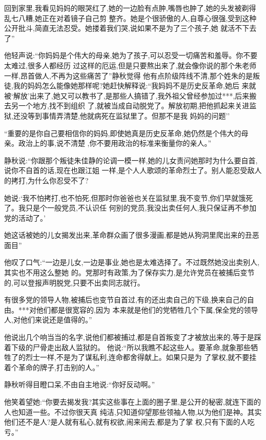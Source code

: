 ﻿\documentclass[12pt]{article}
\begin{document}
回到家里,我看见妈妈的眼哭红了,她的一边脸有点肿,嘴唇也肿了,她的头发被剃得乱七八糟,她正在对着镜子自己剪
整齐。她是个很骄傲的人,自尊心很强,受到这种公开批斗,简直无法忍受。她搂着我们哭,说如果不是为了三个孩子,她
就活不下去了\myrule ''

他轻声说:``你妈妈是个伟大的母亲,她为了孩子,可以忍受一切\myrule 痛苦和羞辱。你不要太难过,很多人都经历
过这样的厄运,但是只要熬出来了,就会像你说的那个朱老师一样,昂首做人,不再为这些痛苦了\myrule ''静秋觉得
他有点阶级阵线不清,那个姓朱的是叛徒,我的妈妈怎么能像她那样呢?她赶快解释说:``我妈妈不是历史反革命,她后
来就被`解放'出来了,她又可以教书了,是那些人搞错了,我外祖父曾经参加过***,后来搬去另一个地方,找不到组织
了,就被当成自动脱党了。解放初期,把他抓起来关进监狱,还没等到事情弄清楚,他就病死在监狱里了。但那不是我
妈妈的问题\myrule ''

``重要的是你自己要相信你的妈妈,即使她真是历史反革命,她仍然是个伟大的母亲。政治上的事,说不清楚\myrule 
,你不要用政治的标准来衡量你的\myrule 亲人。''

静秋说:``你跟那个叛徒朱佳静的论调一模一样,她的儿女责问她那时为什么要自首,说你不自首的话,现在也跟江姐
一样,是个人人歌颂的革命烈士了。别人能忍受敌人的拷打,为什么你忍受不了?

她说:`我不怕拷打,也不怕死,但那时你爸爸也关在监狱里,我不变节,你们早就饿死了。我只是个一般党员,不认识任
何别的党员,我没出卖任何人,我只保证再不参加党的活动了\myrule 。'

她这话被她的儿女揭发出来,革命群众画了很多漫画,都是她从狗洞里爬出来的丑恶面目\myrule ''

他叹了口气:``一边是儿女,一边是事业,她也是太难选择了。不过既然她没出卖别人,其实也不用\myrule 这么整她
的\myrule 。党那时有政策,为了保存实力,是允许党员在被捕后变节的,可以登报声明脱党,只要不出卖同志就行。

有很多党的领导人物,被捕后也变节自首过,有的还出卖自己的下级,换来自己的自由。***对他们都是很宽容的,因为
本来就是他们的党\myrule 牺牲几个下属,保全党的领导人,对他们来说还是值得的。''

他说出几个响当当的名字,说他们都被捕过,都是自首叛变了才被放出来的,等于是踩着下级的尸骨走出敌人监狱的。
他说:``所以我瞧不起这些人。要革命,就象那些牺牲了的烈士一样,不是为了谋私利,连命都舍得献上。如果只是为
了掌权,就不要挂着个革命的牌子,打击别的人。''

静秋听得目瞪口呆,不由自主地说:``你\myrule 好反动啊。''

他笑着望她:``你要去揭发我?其实这些事在上面的圈子里,是公开的秘密,就连下面的人也知道一些。不过你很天真
纯洁,只知道仰望那些领袖人物,以为他们是神。其实他们还不是人?是人就有私心,就有权欲,闹来闹去,都是为了掌
权,只有下面的人吃亏。''
\end{document}
